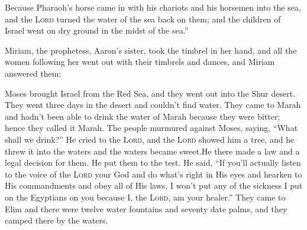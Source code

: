 \begin{inparaenum}
   Because Pharaoh's horse came in with his chariots and his horsemen into the sea, and the \textsc{Lord} turned the water of the sea back on them; and the children of Israel went on dry ground in the midst of the sea.''%
  
   Miriam, the prophetess, Aaron's sister, took the timbrel in her hand, and all the women following her went out with their timbrels and dances,%
   and Miriam answered them:\smallskip%
  
  
   Moses brought Israel from the Red Sea, and they went out into the Shur desert. They went three days in the desert and couldn't find water.%
   They came to Marah and hadn't been able to drink the water of Marah because they were bitter; hence they called it Marah.%
   The people murmured against Moses, saying, ``What shall we drink?''%
   He cried to the \textsc{Lord}, and the \textsc{Lord} showed him a tree, and he threw it into the waters and the waters became sweet.\hspace*{4em}He there made a law and a legal decision for them. He put them to the test.%
   He said, ``If you'll actually listen to the voice of the \textsc{Lord} your God and do what's right in His eyes and hearken to His commandments and obey all of His laws, I won't put any of the sickness I put on the Egyptians on you because I, the \textsc{Lord}, am your healer.''%
   They came to Elim and there were twelve water fountains and seventy date palms, and they camped there by the waters.%
\end{inparaenum}
